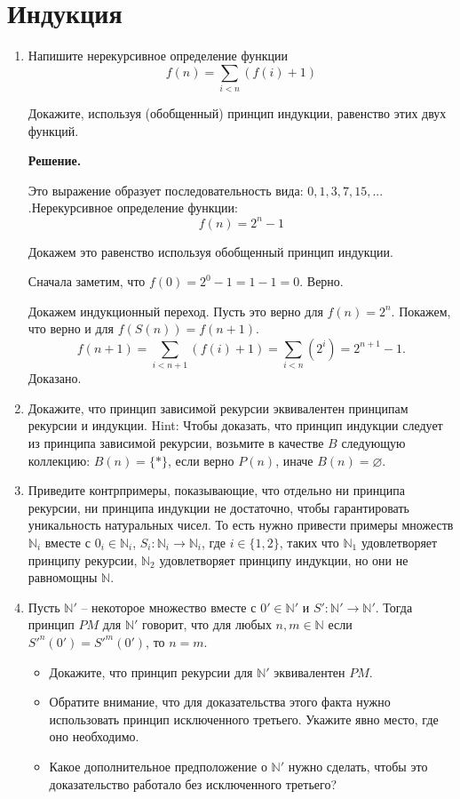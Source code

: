 \section*{Индукция}
\begin{enumerate}

\item Напишите нерекурсивное определение функции
\[ f(n) = \sum_{i < n} (f(i) + 1) \]

Докажите, используя (обобщенный) принцип индукции, равенство этих двух функций.

\textbf{Решение.} 

Это выражение образует последовательность вида: $0, 1, 3, 7, 15,...$ .Нерекурсивное 
определение функции: 
\begin{equation*}
f(n) = 2^n - 1
\end{equation*}

Докажем это равенство используя обобщенный принцип индукции.

Сначала заметим, что $f(0) = 2^0 - 1 = 1 - 1 = 0$. Верно.

Докажем индукционный переход. Пусть это верно для $f(n) = 2^n$. Покажем, что верно и для 
$f(S(n)) = f(n + 1)$.
\begin{equation*}
f(n + 1) = \sum_{i < n + 1} (f(i) + 1) = \sum_{i<n}(2^i) = 2^{n + 1} - 1.
\end{equation*}
Доказано.

\item Докажите, что принцип зависимой рекурсии эквивалентен принципам рекурсии и индукции.
    Hint: Чтобы доказать, что принцип индукции следует из принципа зависимой рекурсии, возьмите 
    в качестве $B$ следующую коллекцию:
    $B(n) = \{ * \}$, если верно $P(n)$, иначе $B(n) = \varnothing$.

\item Приведите контрпримеры, показывающие, что отдельно ни принципа рекурсии, ни принципа 
индукции не достаточно, чтобы гарантировать уникальность натуральных чисел.
    То есть нужно привести примеры множеств $\mathbb{N}_i$ вместе с $0_i \in \mathbb{N}_i$, $S_i 
    : \mathbb{N}_i \to \mathbb{N}_i$, где $i \in \{ 1, 2 \}$,
    таких что $\mathbb{N}_1$ удовлетворяет принципу рекурсии, $\mathbb{N}_2$ удовлетворяет 
    принципу индукции, но они не равномощны $\mathbb{N}$.

\item Пусть $\mathbb{N}'$ -- некоторое множество вместе с $0' \in \mathbb{N}'$ и $S' : 
\mathbb{N}' \to \mathbb{N}'$.
    Тогда принцип $PM$ для $\mathbb{N}'$ говорит, что для любых $n,m \in \mathbb{N}$ если 
    $S'^n(0') = S'^m(0')$, то $n = m$.
\begin{itemize}
\item Докажите, что принцип рекурсии для $\mathbb{N}'$ эквивалентен $PM$.
\item Обратите внимание, что для доказательства этого факта нужно использовать принцип 
исключенного третьего. Укажите явно место, где оно необходимо.
\item Какое дополнительное предположение о $\mathbb{N}'$ нужно сделать, чтобы это доказательство 
работало без исключенного третьего?
\end{itemize}


\end{enumerate}
